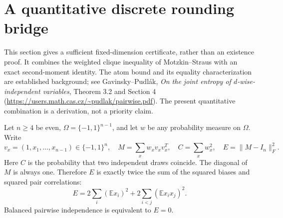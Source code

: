 \section{A quantitative discrete rounding bridge}
\label{sec:discrete-rounding}
This section gives a sufficient fixed-dimension certificate, rather than
an existence proof. It combines the weighted clique inequality of
Motzkin--Straus with an exact second-moment identity. The atom bound
and its equality characterization are established background; see
Gavinsky--Pudl\'ak, \emph{On the joint entropy of $d$-wise-independent
variables}, Theorem 3.2 and Section 4
(\url{https://users.math.cas.cz/~pudlak/pairwise.pdf}).
The present quantitative combination is a derivation, not a priority claim.

Let $n\ge4$ be even, $\Omega=\{-1,1\}^{n-1}$, and let $w$ be any
probability measure on $\Omega$. Write
\[
 v_x=(1,x_1,\ldots,x_{n-1})\in\{-1,1\}^n,\quad
 M=\sum_xw_xv_xv_x^T,\quad C=\sum_xw_x^2,\quad
 E=\|M-I_n\|_F^2.
\]
Here $C$ is the probability that two independent draws coincide.
The diagonal of $M$ is always one. Therefore $E$ is exactly twice
the sum of the squared biases and squared pair correlations:
\[
 E=2\sum_i(\mathbb E x_i)^2+
   2\sum_{i<j}(\mathbb E x_ix_j)^2.
\]
Balanced pairwise independence is equivalent to $E=0$.

